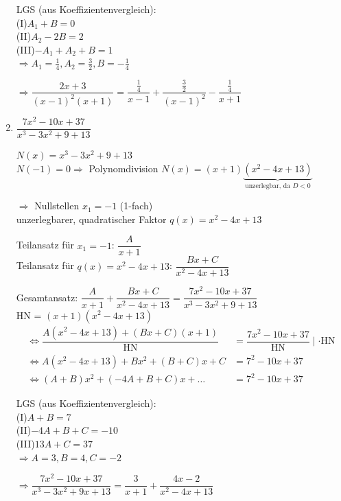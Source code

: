 \begin{enumerate}
	LGS (aus Koeffizientenvergleich):\\
	(I)\quad $A_1+B=0$\\
	(II)\quad $A_2-2B=2$\\
	(III)\quad $-A_1+A_2+B=1$\\
	$\Rightarrow A_1=\frac{1}{4},A_2=\frac{3}{2},B=-\frac{1}{4}$
	
	$\Rightarrow\dfrac{2x+3}{(x-1)^2(x+1)}=\dfrac{\frac{1}{4}}{x-1}+\dfrac{\frac{3}{2}}{(x-1)^2}-\dfrac{\frac{1}{4}}{x+1}$
	
	\item $\dfrac{7x^2-10x+37}{x^3-3x^2+9+13}$
	
	$N(x)=x^3-3x^2+9+13$\\
	$N(-1)=0\Rightarrow$ Polynomdivision $N(x)=(x+1)\underbrace{(x^2-4x+13)}_\text{unzerlegbar, da $D<0$}$
	
	$\Rightarrow$ Nullstellen $x_1=-1$ (1-fach)\\
	unzerlegbarer, quadratischer Faktor $q(x)=x^2-4x+13$
	
	Teilansatz für $x_1=-1$: $\dfrac{A}{x+1}$\\
	Teilansatz für $q(x)=x^2-4x+13$: $\dfrac{Bx+C}{x^2-4x+13}$
	
	Gesamtansatz: $\dfrac{A}{x+1}+\dfrac{Bx+C}{x^2-4x+13}=\dfrac{7x^2-10x+37}{x^3-3x^2+9+13}$\\
	HN = $(x+1)(x^2-4x+13)$
	\begin{align*}
	\Leftrightarrow\dfrac{A(x^2-4x+13)+(Bx+C)(x+1)}{\text{HN}}&=\dfrac{7x^2-10x+37}{\text{HN}}\mid\cdot\text{HN}\\
	\Leftrightarrow A(x^2-4x+13)+Bx^2+(B+C)x+C&=7^2-10x+37\\
	\Leftrightarrow (A+B)x^2+(-4A+B+C)x+\ldots&=7^2-10x+37
	\end{align*}
	
	LGS (aus Koeffizientenvergleich):\\
	(I)\quad $A+B=7$\\
	(II)\quad $-4A+B+C=-10$\\
	(III)\quad $13A+C=37$\\
	$\Rightarrow A=3,B=4,C=-2$
	
	$\Rightarrow\dfrac{7x^2-10x+37}{x^3-3x^2+9x+13}=\dfrac{3}{x+1}+\dfrac{4x-2}{x^2-4x+13}$
\end{enumerate}

